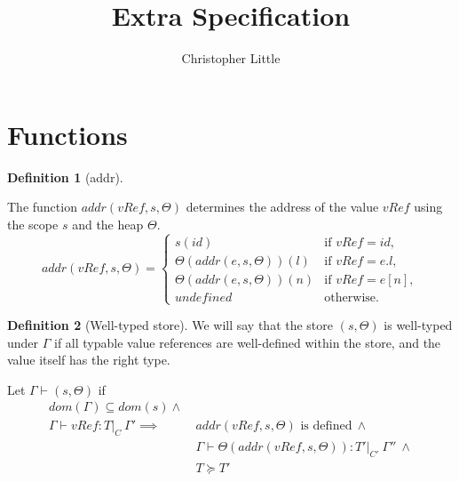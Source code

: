 \documentclass[a4paper]{article}
\theoremstyle{definition}
\newtheorem{definition}{Definition}[section]
\theoremstyle{dotless}
\begin{document}
\title{ Extra Specification }
\author{Christopher Little}
\maketitle

\section{Functions}
\begin{definition}[addr]\label{addr}

  The function $addr(vRef, s, \Theta)$ determines the address of the value $vRef$ using the scope $s$ and the heap $\Theta$.
  \begin{equation}\label{addr-eqn}
  	addr(vRef, s, \Theta) = 
  	\begin{cases}
  	  s(id)& \text{if $vRef = id$}, \\
  	  \Theta(addr(e, s, \Theta))(l) & \text{if $vRef = e.l$}, \\
  	  \Theta(addr(e, s, \Theta))(n) & \text{if $vRef = e[n]$}, \\
  	  undefined & \text{otherwise.}
  	\end{cases}
  \end{equation}
\end{definition}

\begin{definition}[Well-typed store]\label{typed-store}
  We will say that the store $(s,\Theta)$ is well-typed under $\Gamma$ if all typable value
  references are well-defined within the store, and the value itself has
  the right type.

  Let $\Gamma \vdash (s, \Theta)$ if 
  \begin{equation} \label{typed-store-eqn}
  	\begin{split}
  	  dom(\Gamma) \subseteq dom(s) \land\ & \\
  	  \Gamma \vdash vRef:T|_C\ \Gamma' \implies & addr(vRef,s, \Theta)\textrm{ is defined}\ \land \\
  	  & \Gamma\vdash\Theta(addr(vRef,s,\Theta)):T'|_{C'}\ \Gamma''\ \land \\
  	  & T \succeq T'
  	\end{split}
  \end{equation}
\end{definition}
\end{document}
